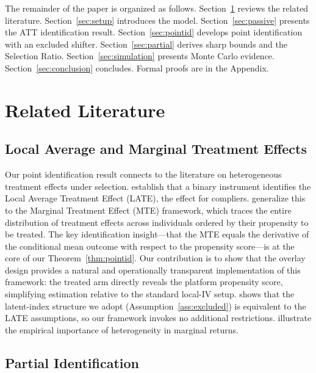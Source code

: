 \documentclass[12pt]{article}
\begin{document}
The remainder of the paper is organized as follows. Section~\ref{sec:lit}
reviews the related literature. Section~\ref{sec:setup} introduces the
model. Section~\ref{sec:passive} presents the ATT identification result.
Section~\ref{sec:pointid} develops point identification with an excluded
shifter. Section~\ref{sec:partial} derives sharp bounds and the Selection
Ratio. Section~\ref{sec:simulation} presents Monte Carlo evidence.
Section~\ref{sec:conclusion} concludes. Formal proofs are in the Appendix.

\section{Related Literature}
\label{sec:lit}

\subsection*{Local Average and Marginal Treatment Effects}

Our point identification result connects to the literature on heterogeneous
treatment effects under selection. \citet{angrist1994identification} establish
that a binary instrument identifies the Local Average Treatment Effect (LATE),
the effect for compliers. \citet{heckman2005structural} generalize this to
the Marginal Treatment Effect (MTE) framework, which traces the entire
distribution of treatment effects across individuals ordered by their
propensity to be treated. The key identification insight---that the MTE equals
the derivative of the conditional mean outcome with respect to the propensity
score---is at the core of our Theorem~\ref{thm:pointid}. Our contribution is
to show that the overlay design provides a natural and operationally transparent
implementation of this framework: the treated arm directly reveals the platform
propensity score, simplifying estimation relative to the standard local-IV setup.
\citet{vytlacil2002independence} shows that the latent-index structure we adopt
(Assumption~\ref{ass:excluded}) is equivalent to the LATE assumptions, so our
framework invokes no additional restrictions. \citet{carneiro2011estimating}
illustrate the empirical importance of heterogeneity in marginal returns.

\subsection*{Partial Identification}
\end{document}

